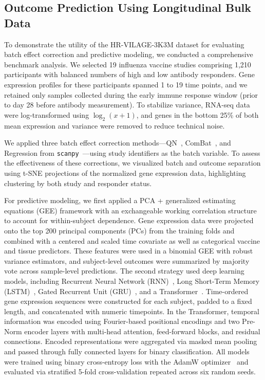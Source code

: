 \documentclass[
  12pt]{article}
\begin{document}
\subsection{Outcome Prediction Using Longitudinal Bulk Data}

To demonstrate the utility of the HR-VILAGE-3K3M dataset for evaluating batch effect correction and predictive modeling, we conducted a comprehensive benchmark analysis. We selected 19 influenza vaccine studies comprising 1,210 participants with balanced numbers of high and low antibody responders. Gene expression profiles for these participants spanned 1 to 19 time points, and we retained only samples collected during the early immune response window (prior to day 28 before antibody measurement). To stabilize variance, RNA-seq data were log-transformed using $\log_2(x + 1)$, and genes in the bottom 25\% of both mean expression and variance were removed to reduce technical noise.

We applied three batch effect correction methods---QN~\citep{bolstad2003comparison}, ComBat~\citep{johnson2007adjusting}, and Regression from \texttt{scanpy~\citep{wolf2018scanpy}}---using study identifiers as the batch variable. To assess the effectiveness of these corrections, we visualized batch and outcome separation using t-SNE projections of the normalized gene expression data, highlighting clustering by both study and responder status.

For predictive modeling, we first applied a PCA + generalized estimating equations (GEE) framework with an exchangeable working correlation structure to account for within-subject dependence. Gene expression data were projected onto the top 200 principal components (PCs) from the training folds and combined with a centered and scaled time covariate as well as categorical vaccine and tissue predictors. These features were used in a binomial GEE with robust variance estimators, and subject-level outcomes were summarized by majority vote across sample-level predictions. The second strategy used deep learning models, including Recurrent Neural Network (RNN)~\citep{elman1990finding,rumelhart1986learning}, Long Short-Term Memory (LSTM)~\citep{hochreiter1997long}, Gated Recurrent Unit (GRU)~\citep{cho2014learning}, and a Transformer~\citep{vaswani2017attention}. Time-ordered gene expression sequences were constructed for each subject, padded to a fixed length, and concatenated with numeric timepoints. In the Transformer, temporal information was encoded using Fourier-based positional encodings and two Pre-Norm encoder layers with multi-head attention, feed-forward blocks, and residual connections. Encoded representations were aggregated via masked mean pooling and passed through fully connected layers for binary classification. All models were trained using binary cross-entropy loss with the AdamW optimizer~\citep{kingma2014adam} and evaluated via stratified 5-fold cross-validation repeated across six random seeds.
\end{document}
